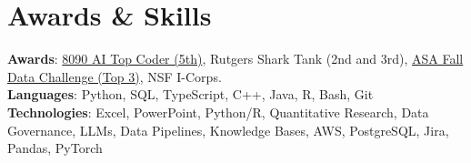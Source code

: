 \documentclass[letterpaper,11pt]{article}
\begin{document}
\section{Awards \& Skills}
 \begin{itemize}[leftmargin=0.15in, label={}]
    \small{\item{
     \textbf{Awards}{: \href{https://github.com/AkeBoss-tech/top-coder-challenge}{8090 AI Top Coder (5th)}, Rutgers Shark Tank (2nd and 3rd), \href{https://acashmoney.biz/portfolio/asa-fall-data/}{ASA Fall Data Challenge (Top 3)}, NSF I-Corps.} \\
     \textbf{Languages}{: Python, SQL, TypeScript, C++, Java, R, Bash, Git} \\
     \textbf{Technologies}{: Excel, PowerPoint, Python/R, Quantitative Research, Data Governance, LLMs, Data Pipelines, Knowledge Bases, AWS, PostgreSQL, Jira, Pandas, PyTorch}
    }}
 \end{itemize}
\end{document}
